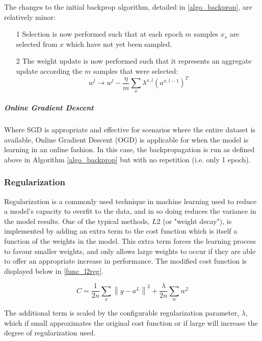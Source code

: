 \documentclass[a4paper,11pt,oneside]{article}
\theoremstyle{plain}
\theoremstyle{definition}
\begin{document}
The changes to the initial backprop algorithm, detailed in \ref{algo_backprop}, are relatively minor:
\begin{itemize}
	\item [1] Selection is now performed such that at each epoch $m$ samples $x_s$ are selected from $x$ which have not yet been sampled.
	\item [2] The weight update is now performed such that it represents an aggregate update according the $m$ samples that were selected:
			\begin{equation}\label{eq_backprop_weightupdate_sgd}
			w^l \rightarrow w^l - \frac{\eta}{m} \sum_{x} \lambda^{x, l} (a^{x, l - 1})^T
			\end{equation}
\end{itemize}

\texttt{}\newline 

\subparagraph{Online Gradient Descent}
Where SGD is appropriate and effective for scenarios where the entire dataset is available, Online Gradient Descent (OGD) is applicable for when the model is learning in an online fashion. In this case, the backpropagation is run as defined above in Algorithm \ref{algo_backprop} but with no repetition (i.e. only 1 epoch).

\subsubsection{Regularization}\label{imp_regularization}

Regularization is a commonly used technique in machine learning used to reduce a model's capacity to overfit to the data, and in so doing reduces the variance in the model results. One of the typical methods, $L2$ (or "weight decay"), is implemented by adding an extra term to the cost function which is itself a function of the weights in the model. This extra term forces the learning process to favour smaller weights, and only allows large weights to occur if they are able to offer an appropriate increase in performance. The modified cost function is displayed below in \ref{func_l2reg}.

\begin{equation}\label{func_l2reg}
C=\frac{1}{2 n} \sum_{x}\left\|y-a^{L}\right\|^{2}+\frac{\lambda}{2 n} \sum_{w} w^{2}
\end{equation}

The additional term is scaled by the configurable regularization parameter, $\lambda$, which if small approximates the original cost function or if large will increase the degree of regularization used. \newline
\end{document}
